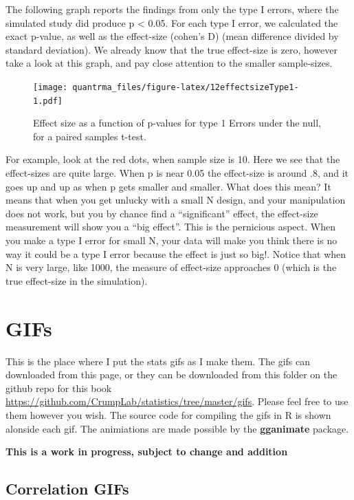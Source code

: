 \documentclass[
]{book}
\begin{document}
The following graph reports the findings from only the type I errors, where the simulated study did produce p \textless{} 0.05. For each type I error, we calculated the exact p-value, as well as the effect-size (cohen's D) (mean difference divided by standard deviation). We already know that the true effect-size is zero, however take a look at this graph, and pay close attention to the smaller sample-sizes.

\begin{figure}
\centering
\texttt{[image: quantrma\_files/figure-latex/12effectsizeType1-1.pdf]}
\caption{\label{fig:12effectsizeType1}Effect size as a function of p-values for type 1 Errors under the null, for a paired samples t-test.}
\end{figure}

For example, look at the red dots, when sample size is 10. Here we see that the effect-sizes are quite large. When p is near 0.05 the effect-size is around .8, and it goes up and up as when p gets smaller and smaller. What does this mean? It means that when you get unlucky with a small N design, and your manipulation does not work, but you by chance find a ``significant'' effect, the effect-size measurement will show you a ``big effect''. This is the pernicious aspect. When you make a type I error for small N, your data will make you think there is no way it could be a type I error because the effect is just so big!. Notice that when N is very large, like 1000, the measure of effect-size approaches 0 (which is the true effect-size in the simulation).

\hypertarget{gifs}{%
\chapter{GIFs}\label{gifs}}

This is the place where I put the stats gifs as I make them. The gifs can downloaded from this page, or they can be downloaded from this folder on the github repo for this book \url{https://github.com/CrumpLab/statistics/tree/master/gifs}. Please feel free to use them however you wish. The source code for compiling the gifs in R is shown alonside each gif. The animiations are made possible by the \textbf{gganimate} package.

\textbf{This is a work in progress, subject to change and addition}

\hypertarget{correlation-gifs}{%
\section{Correlation GIFs}\label{correlation-gifs}}
\end{document}

